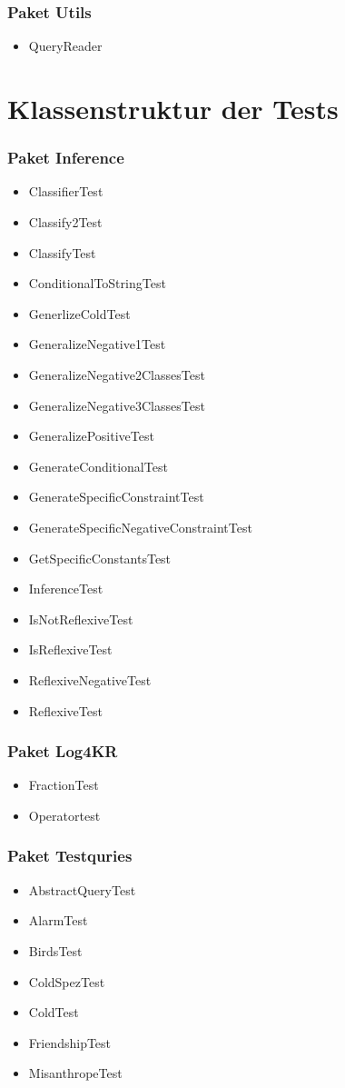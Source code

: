 \documentclass[draft]{scrreprt}
\begin{document}
{\subsubsection{Paket Utils}
\begin{itemize}
	\item QueryReader
\end{itemize}
\section{Klassenstruktur der Tests}
\subsubsection{Paket Inference}
\begin{itemize}
	\item ClassifierTest
	\item Classify2Test
	\item ClassifyTest
	\item ConditionalToStringTest
	\item GenerlizeColdTest
	\item GeneralizeNegative1Test
	\item GeneralizeNegative2ClassesTest
	\item GeneralizeNegative3ClassesTest
	\item GeneralizePositiveTest
	\item GenerateConditionalTest
	\item GenerateSpecificConstraintTest
	\item GenerateSpecificNegativeConstraintTest
	\item GetSpecificConstantsTest
	\item InferenceTest
	\item IsNotReflexiveTest
	\item IsReflexiveTest
	\item ReflexiveNegativeTest
	\item ReflexiveTest
\end{itemize}
\subsubsection{Paket Log4KR}
\begin{itemize}
	\item FractionTest
	\item Operatortest
\end{itemize}
\subsubsection{Paket Testquries}
\begin{itemize}
	\item AbstractQueryTest
	\item AlarmTest
	\item BirdsTest
	\item ColdSpezTest
	\item ColdTest
	\item FriendshipTest
	\item MisanthropeTest
	

\end{itemize}}
\end{document}
